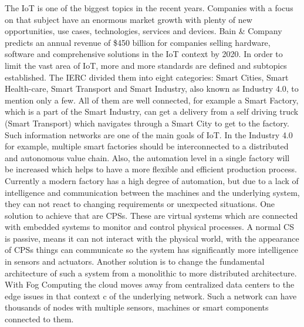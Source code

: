 The \ac{IoT} is one of the biggest topics in the recent years.
Companies with a focus on that subject have an enormous market growth with plenty of new opportunities, use cases, technologies, services and devices.
Bain \& Company predicts an annual revenue of \$450 billion for companies selling hardware, software and comprehensive solutions in the \ac{IoT} context by 2020.\autocite{Bosche:2016}
In order to limit the vast area of \ac{IoT}, more and more standards are defined and subtopics established.
The \ac{IERC} divided them into eight categories: Smart Cities, Smart Health-care, Smart Transport and Smart Industry, also known as Industry 4.0, to mention only a few.\autocite[cf.][p. 7]{IERC:2011}
All of them are well connected, for example a Smart Factory, which is a part of the Smart Industry, can get a delivery from a self driving truck (Smart Transport) which navigates through a Smart City to get to the factory.
Such information networks are one of the main goals of \ac{IoT}.
In the Industry 4.0 for example, multiple smart factories should be interconnected to a distributed and autonomous value chain.
Also, the automation level in a single factory will be increased which helps to have a more flexible and efficient production process.
Currently a modern factory has a high degree of automation, but due to a lack of intelligence and communication between the machines and the underlying system, they can not react to changing requirements or unexpected situations.
One solution to achieve that are \acp{CPS}.
These are virtual systems which are connected with embedded systems to monitor and control physical processes.\autocite[cf.][p. 363]{Lee:2008}
A normal \ac{CS} is passive, means it can not interact with the physical world, with the appearance of \acp{CPS} things can communicate so the system has significantly more intelligence in sensors and actuators.\autocite[cf.][p. 1363 f.]{Poovendran:2010}
\newpage
Another solution is to change the fundamental architecture of such a system from a monolithic to more distributed architecture.
With Fog Computing the cloud moves away from centralized data centers to the edge issues in that context c of the underlying network.\autocite[cf.][p. 380]{Pahl:2015}
Such a network can have thousands of nodes with multiple sensors, machines or smart components connected to them.
